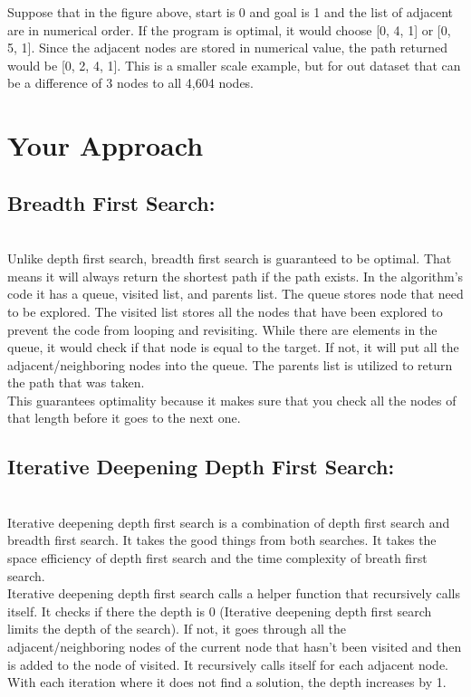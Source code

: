\documentclass[letterpaper]{article} %
\begin{document}
Suppose that in the figure above, start is 0 and goal is 1 and the list of adjacent are in numerical order. If the program is optimal, it would choose [0, 4, 1] or [0, 5, 1]. Since the adjacent nodes are stored in numerical value, the path returned would be [0, 2, 4, 1]. This is a smaller scale example, but for out dataset that can be a difference of 3 nodes to all 4,604 nodes.

\section{Your Approach}

\subsection{Breadth First Search:}\\
Unlike depth first search, breadth first search is guaranteed to be optimal. That means it will always return the shortest path if the path exists. In the algorithm's code it has a queue, visited list, and parents list. The queue stores node that need to be explored. The visited list stores all the nodes that have been explored to prevent the code from looping and revisiting. While there are elements in the queue, it would check if that node is equal to the target. If not, it will put all the adjacent/neighboring nodes into the queue. The parents list is utilized to return the path that was taken.\\
This guarantees optimality because it makes sure that you check all the nodes of that length before it goes to the next one. 

\subsection{Iterative Deepening Depth First Search:}\\
Iterative deepening depth first search is a combination of depth first search and breadth first search. It takes the good things from both searches. It takes the space efficiency of depth first search and the time complexity of breath first search.\\
Iterative deepening depth first search calls a helper function that recursively calls itself. It checks if there the depth is 0 (Iterative deepening depth first search limits the depth of the search). If not, it goes through all the adjacent/neighboring nodes of the current node that hasn't been visited and then is added to the node of visited. It recursively calls itself for each adjacent node. With each iteration where it does not find a solution, the depth increases by 1. 
\end{document}
